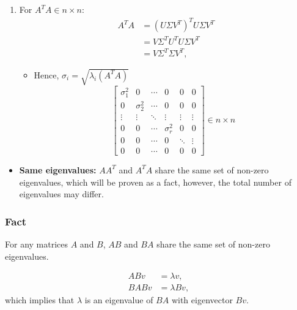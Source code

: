 \begin{derivation}
\begin{enumerate}
        \item For \( A^T A \in n \times n\):
        \begin{align*}
            A^T A &= (U \Sigma V^T)^T U \Sigma V^T \\
            &= V \Sigma^T U^T U \Sigma V^T \\
            &= V \Sigma^T \Sigma V^T,
        \end{align*}
        \begin{itemize}
            \item Hence, \( \sigma_i = \sqrt{\lambda_i(A^T A)} \)
            \[
            \begin{bmatrix}
            \sigma_1^2 & 0         & \cdots & 0       & 0       & 0       \\
            0          & \sigma_2^2 & \cdots & 0       & 0       & 0       \\
            \vdots     & \vdots    & \ddots & \vdots  & \vdots  & \vdots  \\
            0          & 0         & \cdots & \sigma_r^2 & 0       & 0       \\
            0          & 0         & \cdots & 0       & \ddots  & \vdots  \\
            0          & 0         & \cdots & 0       & 0       & 0
            \end{bmatrix} \in n \times n
            \]
        \end{itemize}
    \end{enumerate}
    \begin{itemize}
        \item \textbf{Same eigenvalues:} \( A A^T \) and \( A^T A \) share the same set of non-zero eigenvalues, which will be proven as a fact, however, the total number of eigenvalues may differ.
    \end{itemize}
\end{derivation}

\subsubsection{Fact}
\begin{definition}
    For any matrices \( A \) and \( B \), \( AB \) and \( BA \) share the same set of non-zero eigenvalues.
\end{definition}

\begin{derivation}
    \begin{align*}
        A B v &= \lambda v, \\
        B A B v &= \lambda B v, 
    \end{align*}
    which implies that \( \lambda \) is an eigenvalue of \( BA \) with eigenvector $Bv$.
\end{derivation}\

